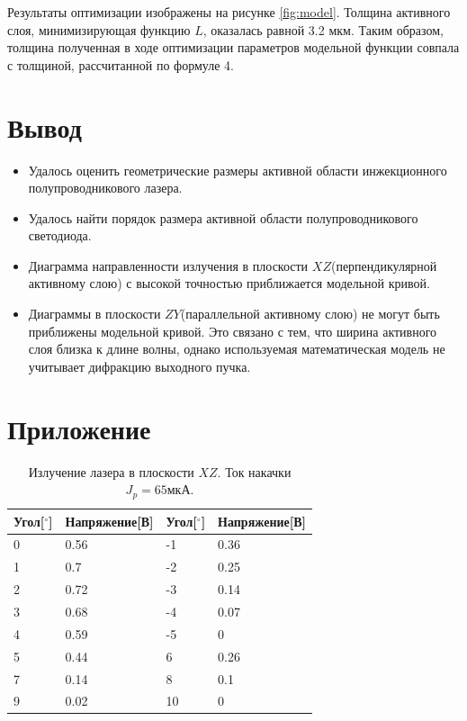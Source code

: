 \documentclass[a4paper, 12pt]{extarticle}
\begin{document}
Результаты оптимизации изображены на рисунке \ref{fig:model}. Толщина активного слоя, минимизирующая функцию $L$, оказалась равной 3.2 мкм. Таким образом, толщина полученная в ходе оптимизации параметров модельной функции совпала с толщиной, рассчитанной по формуле 4.

\section*{\textcolor{header}{Вывод}}

\begin{itemize}
    \item Удалось оценить геометрические размеры активной области инжекционного полупроводникового лазера.
    \item Удалось найти порядок размера активной области полупроводникового светодиода.
    \item Диаграмма направленности излучения в плоскости $XZ$(перпендикулярной активному слою) с высокой точностью приближается модельной кривой.
    \item Диаграммы в плоскости $ZY$(параллельной активному слою) не могут быть приближены модельной кривой. Это связано с тем, что ширина активного слоя близка к длине волны, однако используемая математическая модель не учитывает дифракцию выходного пучка.
\end{itemize}


\section*{\textcolor{header}{Приложение}}

\begin{table}[hbtp]
    \begin{center}
        \begin{tabular}{|l|l|l|l|}
            \hline
            Угол[$^{\circ}$] & Напряжение[В] & Угол[$^{\circ}$] & Напряжение[В] \\
            \hline
            0  & 0.56 & -1  & 0.36 \\
            1  & 0.7  & -2  & 0.25 \\
            2  & 0.72 & -3  & 0.14 \\
            3  & 0.68 & -4  & 0.07 \\
            4  & 0.59 & -5  & 0    \\
            5  & 0.44 & 6   & 0.26 \\
            7  & 0.14 & 8   & 0.1  \\
            9  & 0.02 & 10  & 0    \\
            \hline
        \end{tabular}
    \end{center}
    \caption{Излучение лазера в плоскости $XZ$. Ток накачки $J_p = 65\text{мкА}$.}
    \label{tab:XZ_65}
\end{table}
\end{document}
